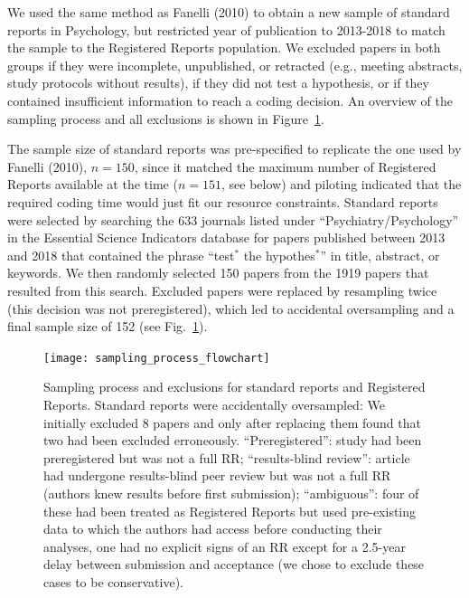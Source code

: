 \documentclass[british,,jou,floatsintext]{apa6}
\begin{document}
We used the same method as Fanelli (2010) to obtain a new sample of standard reports in Psychology, but restricted year of publication to 2013-2018 to match the sample to the Registered Reports population.
We excluded papers in both groups if they were incomplete, unpublished, or retracted (e.g., meeting abstracts, study protocols without results), if they did not test a hypothesis, or if they contained insufficient information to reach a coding decision.
An overview of the sampling process and all exclusions is shown in Figure~\ref{fig:sampling}.

The sample size of standard reports was pre-specified to replicate the one used by Fanelli (2010), \(n = 150\), since it matched the maximum number of Registered Reports available at the time (\(n = 151\), see below) and piloting indicated that the required coding time would just fit our resource constraints.
Standard reports were selected by searching the 633 journals listed under \enquote{Psychiatry/Psychology} in the Essential Science Indicators database for papers published between 2013 and 2018 that contained the phrase \enquote{test\(^\ast\) the hypothes\(^\ast\)} in title, abstract, or keywords.
We then randomly selected 150 papers from the 1919 papers that resulted from this search. Excluded papers were replaced by resampling twice (this decision was not preregistered), which led to accidental oversampling and a final sample size of 152 (see Fig.~\ref{fig:sampling}).



\begin{figure}
\texttt{[image: sampling\_process\_flowchart]} \caption{Sampling process and exclusions for standard reports and Registered Reports. Standard reports were accidentally oversampled: We initially excluded 8 papers and only after replacing them found that two had been excluded erroneously. \enquote{Preregistered}: study had been preregistered but was not a full RR; \enquote{results-blind review}: article had undergone results-blind peer review but was not a full RR (authors knew results before first submission); \enquote{ambiguous}: four of these had been treated as Registered Reports but used pre-existing data to which the authors had access before conducting their analyses, one had no explicit signs of an RR except for a 2.5-year delay between submission and acceptance (we chose to exclude these cases to be conservative).}\label{fig:sampling}
\end{figure}
\end{document}
